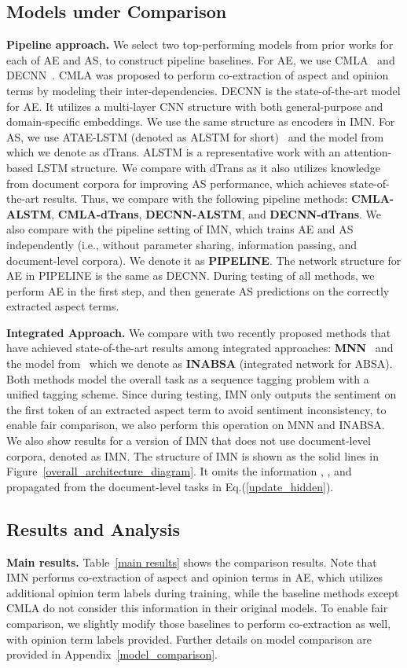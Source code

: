 \documentclass[11pt,a4paper]{article}
\begin{document}
\subsection{Models under Comparison}
\textbf{Pipeline approach. } 
We select two top-performing models from prior works for each of AE and AS, to construct  pipeline baselines.
For AE, we use CMLA~\citep{Wang:17} and DECNN~\citep{hu:18}. CMLA was proposed to perform co-extraction of aspect and opinion terms by modeling their inter-dependencies. DECNN is the state-of-the-art model for AE. It utilizes a multi-layer CNN structure with both general-purpose and domain-specific embeddings. We use the same structure as encoders in IMN.
For AS, we use ATAE-LSTM (denoted as ALSTM for short)~\citep{Wang:16} and the model from~\citep{He:18} which we denote as dTrans. ALSTM is a representative work with an attention-based LSTM structure. We compare with dTrans as it also utilizes knowledge from document corpora for improving AS performance, which achieves state-of-the-art results.  Thus, we compare with the following pipeline methods: \textbf{CMLA-ALSTM}, \textbf{CMLA-dTrans}, \textbf{DECNN-ALSTM}, and \textbf{DECNN-dTrans}. We also compare with the pipeline setting of IMN, which trains AE and AS independently (i.e., without parameter sharing, information passing, and document-level corpora). We denote it as \textbf{PIPELINE}. The network structure for AE in PIPELINE is the same as DECNN. During testing of all methods, we perform AE in the first step, and then generate AS predictions on the correctly extracted aspect terms. 
\smallskip

\noindent\textbf{Integrated Approach. } We compare with two recently proposed methods that have achieved state-of-the-art results among integrated approaches: \textbf{MNN}~\citep{Wang:18b} and the model from~\citep{Li:19} which we denote as \textbf{INABSA} (integrated network for ABSA). Both methods model the overall task as a sequence tagging problem with a unified tagging scheme. Since during testing, IMN only outputs the sentiment on the first token of an extracted aspect term to avoid sentiment inconsistency, to enable fair comparison, we also perform this operation on MNN and INABSA. We also show results for a version of IMN that does not use document-level corpora, denoted as IMN. The structure of IMN is shown as the solid lines in Figure~\ref{overall_architecture_diagram}. It omits the information , , and  propagated from the document-level tasks in Eq.(\ref{update_hidden}).
\medskip


\subsection{Results and Analysis}
\textbf{Main results.} 
Table~\ref{main results} shows the comparison results.
Note that IMN performs co-extraction of aspect and opinion terms in AE, which utilizes additional opinion term labels during training, while the baseline methods except CMLA do not consider this information in their original models. To enable fair comparison, we slightly modify those baselines to perform co-extraction as well, with opinion term labels provided. Further details on model comparison are provided in Appendix~\ref{model_comparison}.
\end{document}
